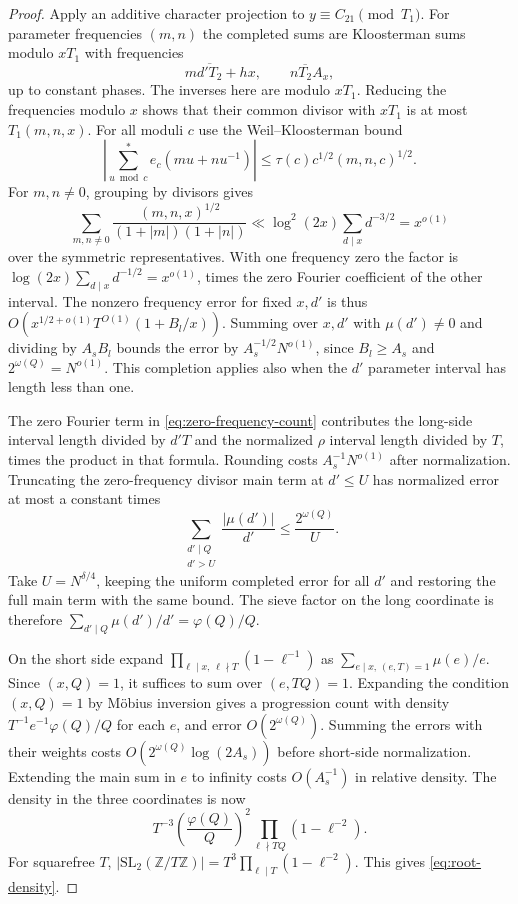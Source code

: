 \documentclass[11pt]{amsart}
\numberwithin{equation}{section}
\theoremstyle{remark}
\begin{document}
\begin{proof}
Apply an additive character projection to $y\equiv C_{21}\pmod{T_1}$.
For parameter frequencies $(m,n)$ the completed sums are
Kloosterman sums modulo $xT_1$ with frequencies
\[
 m\overline{d'T_2}+hx,\qquad n\overline{T_2}A_x,
\]
up to constant phases. The inverses here are modulo $xT_1$.
Reducing the frequencies modulo $x$ shows that their common divisor
with $xT_1$ is at most $T_1(m,n,x)$. For all moduli $c$ use the
Weil--Kloosterman bound
\[
 \left|\sum_{u\bmod c}^{*} e_c(mu+nu^{-1})\right|
 \leq\tau(c)c^{1/2}(m,n,c)^{1/2}.
\]
\cite[Eq.~(1.2)]{BlomerMan}
For $m,n\ne0$, grouping by divisors gives
\[
 \sum_{m,n\ne0}\frac{(m,n,x)^{1/2}}{(1+|m|)(1+|n|)}
 \ll \log^2(2x)\sum_{d\mid x}d^{-3/2}=x^{o(1)}
\]
over the symmetric representatives. With one frequency zero the
factor is $\log(2x)\sum_{d\mid x}d^{-1/2}=x^{o(1)}$, times the
zero Fourier coefficient of the other interval. The nonzero
frequency error for fixed $x,d'$ is thus
$O(x^{1/2+o(1)}T^{O(1)}(1+B_l/x))$. Summing over $x,d'$ with $\mu(d')\ne0$ and
dividing by $A_sB_l$ bounds the error by $A_s^{-1/2}N^{o(1)}$, since
$B_l\geq A_s$ and $2^{\omega(Q)}=N^{o(1)}$. This completion applies
also when the $d'$ parameter interval has length less than one.

The zero Fourier term in \eqref{eq:zero-frequency-count} contributes
the long-side interval length divided by $d'T$ and the normalized
$\rho$ interval length divided by $T$, times the product in that
formula. Rounding costs $A_s^{-1}N^{o(1)}$ after normalization.
Truncating the zero-frequency divisor main term at $d'\leq U$
has normalized error at most a constant times
\begin{equation}\label{eq:large-divisor-error}
 \sum_{\substack{d'\mid Q\\d'>U}}\frac{|\mu(d')|}{d'}
   \leq \frac{2^{\omega(Q)}}{U}.
\end{equation}
Take $U=N^{\delta/4}$, keeping the uniform completed error for all
$d'$ and restoring the full main term with the same bound. The
sieve factor on the long coordinate is therefore
$\sum_{d'\mid Q}\mu(d')/d'=\varphi(Q)/Q$.

On the short side expand $\prod_{\ell\mid x,\,\ell\nmid T}(1-\ell^{-1})$
as $\sum_{e\mid x,\,(e,T)=1}\mu(e)/e$. Since $(x,Q)=1$, it suffices to
sum over $(e,TQ)=1$. Expanding the condition $(x,Q)=1$ by M\"obius
inversion gives a progression count with density
$T^{-1}e^{-1}\varphi(Q)/Q$ for each $e$, and error $O(2^{\omega(Q)})$.
Summing the errors with their weights costs
$O(2^{\omega(Q)}\log(2A_s))$ before short-side normalization.
Extending the main sum in $e$ to infinity costs $O(A_s^{-1})$ in
relative density. The density in the three coordinates is now
\[
 T^{-3}\left(\frac{\varphi(Q)}{Q}\right)^2
       \prod_{\ell\nmid TQ}(1-\ell^{-2}).
\]
For squarefree $T$,
$|\mathrm{SL}_2(\mathbb Z/T\mathbb Z)|=T^3\prod_{\ell\mid T}(1-\ell^{-2})$.
This gives \eqref{eq:root-density}.


\end{proof}
\end{document}
